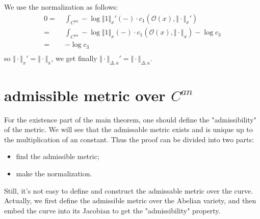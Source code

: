 \documentclass[reqno,11pt]{amsart}
\numberwithin{equation}{section}
\theoremstyle{plain}
\theoremstyle{plain}
\numberwithin{equation}{section}
\theoremstyle{remark}
\newcommand{\norm}[1]{\Vert{#1}\Vert}
\begin{document}
We use the normalization as follows:
\begin{equation*}
\begin{aligned}
0  =\;& \int_{C^{an}}-\log \norm{1}_x'(-) \cdot c_1(\mathcal{O}(x),\norm{\cdot}_x')\\ 
  =\;& \int_{C^{an}}-\log \norm{1}_x(-) \cdot c_1(\mathcal{O}(x),\norm{\cdot}_x) -\log c_3 \\ 
  =\;&  -\log c_3 \\ 
\end{aligned}
\end{equation*}
so $\norm{\cdot}_x'=\norm{\cdot}_x$, we get finally $\norm{\cdot}_{\Delta,a}'=\norm{\cdot}_{\Delta,a}$.

\section{admissible metric over $C^{an}$}\label{sec:existence}

For the existence part of the main theorem, one should define the "admissibility" of the metric. We will see that the admissable metric exists and is unique up to the multiplication of an constant. Thus the proof can be divided into two parts:
\begin{itemize}
\item find the admissible metric;
\item make the normalization.
\end{itemize}
Still, it's not easy to define and construct the admissable metric over the curve. Actually, we first define the admissible metric over the Abelian variety, and then embed the curve into its Jacobian to get the "admissibility" property.
\end{document}
